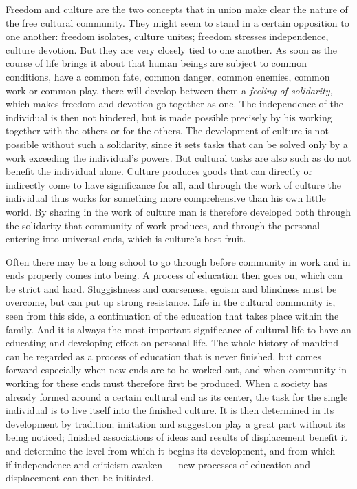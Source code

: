 \documentclass[12pt,a4paper,openany]{book}
\newcommand{\opage}[1]{\marginnote{\footnotesize\textit{[#1]}}}
\begin{document}
Freedom and culture are the two concepts that in union make clear the nature of the free cultural community. They might
seem to stand in a certain opposition to one another: freedom isolates, culture unites; freedom stresses independence,
culture devotion. But they are very closely tied to one another.
\opage{343}As soon as the course of life brings it about that human beings are subject to common conditions, have a
common fate, common danger, common enemies, common work or common play, there will develop between them a \textit{feeling
of solidarity,} which makes freedom and devotion go together as one. The independence of the individual is then not
hindered, but is made possible precisely by his working together with the others or for the others. The development of
culture is not possible without such a solidarity, since it sets tasks that can be solved only by a work exceeding the
individual's powers. But cultural tasks are also such as do not benefit the individual alone. Culture produces goods that
can directly or indirectly come to have significance for all, and through the work of culture the individual thus works
for something more comprehensive than his own little world. By sharing in the work of culture man is therefore developed
both through the solidarity that community of work produces, and through the personal entering into universal ends,
which is culture's best fruit.

Often there may be a long school to go through before community in work and in ends properly comes into being. A process
of education then goes on, which can be strict and hard. Sluggishness and coarseness, egoism and blindness must be
overcome, but can put up strong resistance. Life in the cultural community is, seen from this side, a continuation of
the education that takes place within the family. And it is always the most important significance of cultural life to
have an educating and developing effect on personal life. The whole history of mankind can be regarded as a process of
education that is never finished, but comes forward especially when new ends are to be worked out, and when community in
working for these ends must therefore first be produced. When a society has already formed around a certain cultural end
as its center, the task for the single individual is to live itself into the finished culture. It is then determined in
its development by tradition; imitation and suggestion play a great part without its being noticed; finished
associations of ideas and results of displacement benefit it and determine the level from which it begins its
development,
\opage{344}and from which --- if independence and criticism awaken --- new processes of education and displacement can
then be initiated.
\end{document}

